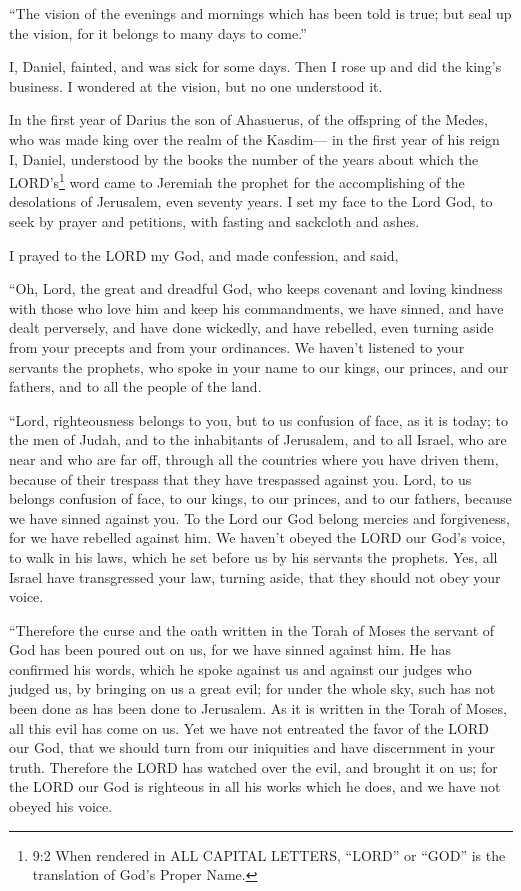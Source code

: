 \myverse{}“The vision of the evenings and mornings which has been told
is true; but seal up the vision, for it belongs to many days to come.”

\myverse{}I, Daniel, fainted, and was sick for some days. Then I rose up
and did the king’s business. I wondered at the vision, but no one understood it.


\mychapter{} \myverse*{}In the first year of Darius the son of Ahasuerus, of the offspring
of the Medes, who was made king over the realm of the Kasdim—
\myverse{}in the first year of his reign I, Daniel, understood by the books the number
of the years about which the LORD’s\footnote{9:2 When rendered in ALL CAPITAL LETTERS, “LORD” or “GOD” is the translation of God’s Proper Name.
} word came to Jeremiah the prophet for the accomplishing of the desolations of Jerusalem, even
seventy years.
\myverse{}I set my face to the Lord God, to seek by prayer and petitions, with fasting
and sackcloth and ashes.

\myverse{}I prayed to the LORD my God, and made confession, and said,

“Oh, Lord, the great and dreadful God, who keeps covenant and loving kindness
with those who love him and keep his commandments,
\myverse{}we have sinned, and have dealt perversely, and have done wickedly, and have
rebelled, even turning aside from your precepts and from your ordinances.
\myverse{}We haven’t listened to your servants the prophets, who spoke in your name to
our kings, our princes, and our fathers, and to all the people of the land.

\myverse{}“Lord, righteousness belongs to you, but to us confusion
of face, as it is today; to the men of Judah, and to the inhabitants of Jerusalem, and to all Israel,
who are near and who are far off, through all the countries where you have driven them, because of their
trespass that they have trespassed against you.
\myverse{}Lord, to us belongs confusion of face, to our kings, to our princes, and to
our fathers, because we have sinned against you.
\myverse{}To the Lord our God belong mercies and forgiveness, for we have rebelled against
him.
\myverse{}We haven’t obeyed the LORD our God’s voice, to walk in his laws, which he
set before us by his servants the prophets.
\myverse{}Yes, all Israel have transgressed your law, turning aside, that they should
not obey your voice.

“Therefore the curse and the oath written in the Torah of Moses the servant of
God has been poured out on us, for we have sinned against him.
\myverse{}He has confirmed his words, which he spoke against us and against our judges
who judged us, by bringing on us a great evil; for under the whole sky, such has not been done as has
been done to Jerusalem.
\myverse{}As it is written in the Torah of Moses, all this evil has come on us. Yet
we have not entreated the favor of the LORD our God, that we should turn from our iniquities and have
discernment in your truth.
\myverse{}Therefore the LORD has watched over the evil, and brought it on us; for the
LORD our God is righteous in all his works which he does, and we have not obeyed his voice.


